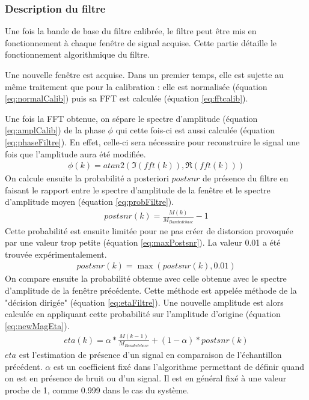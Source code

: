 \documentclass[letterpaper, twoside, 12pt, memoire, creativecommons, hyperref]{thETS}
\begin{document}
\subsubsection{Description du filtre}

Une fois la bande de base du filtre calibrée, le filtre peut être mis en fonctionnement à chaque fenêtre de signal acquise. Cette partie détaille le fonctionnement algorithmique du filtre. 

Une nouvelle fenêtre est acquise. Dans un premier temps, elle est sujette au même traitement que pour la calibration : elle est normalisée (équation \ref{eq:normalCalib}) puis sa FFT est calculée (équation \ref{eq:fftcalib}).

Une fois la FFT obtenue, on sépare le spectre d'amplitude (équation \ref{eq:amplCalib}) de la phase $\phi$ qui cette fois-ci est aussi calculée (équation \ref{eq:phaseFiltre}). En effet, celle-ci sera nécessaire pour reconstruire le signal une fois que l'amplitude aura été modifiée.
\begin{align}\label{eq:phaseFiltre}
   \phi(k) = atan2(\Im(fft(k)), \Re(fft(k)))
\end{align}
On calcule ensuite la probabilité a posteriori $postsnr$ de présence du filtre en faisant le rapport entre le spectre d'amplitude de la fenêtre et le spectre d'amplitude moyen (équation \ref{eq:probFiltre}).
\begin{align}\label{eq:probFiltre}
   postsnr(k) = \frac{M(k)}{M_{Bande de base}} - 1
\end{align}
Cette probabilité est ensuite limitée pour ne pas créer de distorsion provoquée par une valeur trop petite (équation \ref{eq:maxPostsnr}). La valeur 0.01 a été trouvée expérimentalement.
\begin{align}\label{eq:maxPostsnr}
   postsnr(k) = \max(postsnr(k), 0.01)
\end{align}
On compare ensuite la probabilité obtenue avec celle obtenue avec le spectre d'amplitude de la fenêtre précédente. Cette méthode est appelée méthode de la "décision dirigée" (équation \ref{eq:etaFiltre}). Une nouvelle amplitude est alors calculée en appliquant cette probabilité sur l'amplitude d'origine (équation \ref{eq:newMagEta}).
\begin{align}\label{eq:etaFiltre}
   eta(k) = \alpha * \frac{M(k-1)}{M_{Bande de base}} + (1 - \alpha) * postsnr(k)
\end{align}
$eta$ est l'estimation de présence d'un signal en comparaison de l'échantillon précédent. $\alpha$ est un coefficient fixé dans l'algorithme permettant de définir quand on est en présence de bruit ou d'un signal. Il est en général fixé à une valeur proche de 1, comme 0.999 dans le cas du système.
\end{document}
